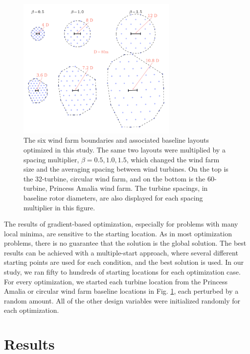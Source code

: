 \documentclass[WESD, manuscript]{copernicus}
\begin{document}
\begin{figure}[htbp]
  \centering
  \includegraphics[width=0.7\textwidth]{Figures/spacing_multipliers.pdf}
  \caption{\label{farm_spacings}The six wind farm boundaries and associated baseline layouts optimized in this study. The same two layouts were multiplied by a spacing multiplier, $\beta=0.5,1.0,1.5$, which changed the wind farm size and the averaging spacing between wind turbines.  On the top is the 32-turbine, circular wind farm, and on the bottom is the 60-turbine, Princess Amalia wind farm. The turbine spacings, in baseline rotor diameters, are also displayed for each spacing multiplier in this figure.}
\end{figure}

The results of gradient-based optimization, especially for problems with many local minima, are sensitive to the starting location. As in most optimization problems, there is no guarantee that the solution is the global solution. The best results can be achieved with a multiple-start approach, where several different starting points are used for each condition, and the best solution is used. In our study, we ran fifty to hundreds of starting locations for each optimization case. For every optimization, we started each turbine location from the Princess Amalia or circular wind farm baseline locations in Fig. \ref{farm_spacings}, each perturbed by a random amount. All of the other design variables were initialized randomly for each optimization.




\section{Results}
\newcommand\myeq{\mkern1.5mu{=}\mkern1.5mu}
\end{document}
